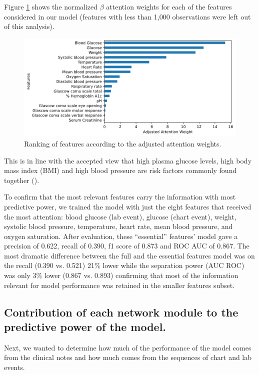 \documentclass{sigkddExp}
\begin{document}
Figure \ref{fig:att-weights} shows the normalized $\beta$ attention weights for each of the features considered 
in our model (features with less than 1,000 observations were left out of this analysis).

\graphicspath{ {figures/} } 
\begin{figure}[h]\centering
\includegraphics[width=1\columnwidth]{attention-weights.png}
\caption{Ranking of features according to the adjusted attention weights.}
\label{fig:att-weights}
\end{figure}

This is in line with the accepted view that high plasma glucose levels, 
high body mass index (BMI) and high blood pressure are risk factors commonly 
found together (\cite{lim}). 

To confirm that the most relevant features carry the information with most 
predictive power, we trained the model with just the eight features that received 
the most attention: blood glucose (lab event), glucose (chart event), weight, systolic 
blood pressure, temperature, heart rate, mean blood pressure, and oxygen saturation.  
After evaluation, these “essential” features’ model gave a precision of 0.622, recall of 0.390, 
f1 score of 0.873 and ROC AUC of 0.867.  The most dramatic difference between the full and the 
essential features model was on the recall (0.390 vs. 0.521) 21\% lower while the separation 
power (AUC ROC) was only 3\% lower (0.867 vs. 0.893) confirming that most of the information 
relevant for model performance was retained in the smaller features subset. 

\subsection{Contribution of each network module to the predictive power of the model.}
Next, we wanted to determine how much of the performance of the model comes from 
the clinical notes and how much comes from the sequences of chart and lab events.  
\end{document}
